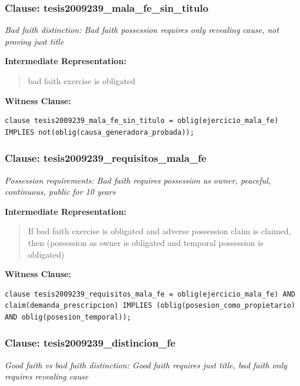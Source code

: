 \documentclass[11pt,a4paper]{article}
\begin{document}
\subsubsection{Clause: tesis2009239\_mala\_fe\_sin\_titulo}

\textit{Bad faith distinction: Bad faith possession requires only revealing cause, not proving just title}

\textbf{Intermediate Representation:}

\begin{quote}
bad faith exercise is obligated
\end{quote}

\textbf{Witness Clause:}

\begin{lstlisting}[style=witnessstyle, language=Witness]
clause tesis2009239_mala_fe_sin_titulo = oblig(ejercicio_mala_fe) IMPLIES not(oblig(causa_generadora_probada));
\end{lstlisting}

\subsubsection{Clause: tesis2009239\_requisitos\_mala\_fe}

\textit{Possession requirements: Bad faith requires possession as owner, peaceful, continuous, public for 10 years}

\textbf{Intermediate Representation:}

\begin{quote}
If bad faith exercise is obligated and adverse possession claim is claimed, then (possession as owner is obligated and temporal possession is obligated)
\end{quote}

\textbf{Witness Clause:}

\begin{lstlisting}[style=witnessstyle, language=Witness]
clause tesis2009239_requisitos_mala_fe = oblig(ejercicio_mala_fe) AND claim(demanda_prescripcion) IMPLIES (oblig(posesion_como_propietario) AND oblig(posesion_temporal));
\end{lstlisting}

\subsubsection{Clause: tesis2009239\_distincion\_fe}

\textit{Good faith vs bad faith distinction: Good faith requires just title, bad faith only requires revealing cause}
\end{document}
